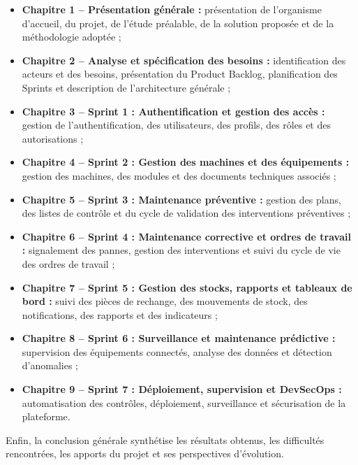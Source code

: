 \begin{itemize}
    \item \textbf{Chapitre 1 -- Présentation générale :} présentation de l’organisme d’accueil, du projet, de l’étude préalable, de la solution proposée et de la méthodologie adoptée ;

    \item \textbf{Chapitre 2 -- Analyse et spécification des besoins :} identification des acteurs et des besoins, présentation du Product Backlog, planification des Sprints et description de l’architecture générale ;

    \item \textbf{Chapitre 3 -- Sprint 1 : Authentification et gestion des accès :} gestion de l’authentification, des utilisateurs, des profils, des rôles et des autorisations ;

    \item \textbf{Chapitre 4 -- Sprint 2 : Gestion des machines et des équipements :} gestion des machines, des modules et des documents techniques associés ;

    \item \textbf{Chapitre 5 -- Sprint 3 : Maintenance préventive :} gestion des plans, des listes de contrôle et du cycle de validation des interventions préventives ;

    \item \textbf{Chapitre 6 -- Sprint 4 : Maintenance corrective et ordres de travail :} signalement des pannes, gestion des interventions et suivi du cycle de vie des ordres de travail ;

    \item \textbf{Chapitre 7 -- Sprint 5 : Gestion des stocks, rapports et tableaux de bord :} suivi des pièces de rechange, des mouvements de stock, des notifications, des rapports et des indicateurs ;

    \item \textbf{Chapitre 8 -- Sprint 6 : Surveillance et maintenance prédictive :} supervision des équipements connectés, analyse des données et détection d’anomalies ;

    \item \textbf{Chapitre 9 -- Sprint 7 : Déploiement, supervision et DevSecOps :} automatisation des contrôles, déploiement, surveillance et sécurisation de la plateforme.
\end{itemize}

Enfin, la conclusion générale synthétise les résultats obtenus, les difficultés rencontrées, les apports du projet et ses perspectives d’évolution.



